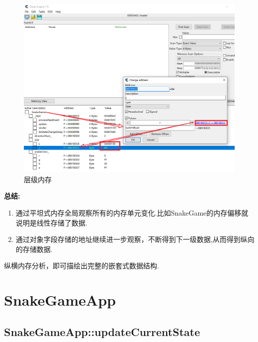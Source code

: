 \documentclass[AutoFakeBold,AutoFakeSlant]{beamer}
\begin{document}
	
	\begin{frame}[fragile]
		\begin{figure}
			\centering %
			\includegraphics[width=0.85\linewidth]{CE_MEM_TREE.png}
			\caption{层级内存}
			\label{fig:CE_MEM_TREE}
		\end{figure}
	\end{frame}
		
	\begin{frame}[fragile]
		\normalsize
		\textbf{总结:} \\ 
		\begin{enumerate}
			\item 通过平坦式内存全局观察所有的内存单元变化.比如SnakeGame的内存偏移就说明是线性存储了数据.
			\item 通过对象字段存储的地址继续进一步观察，不断得到下一级数据,从而得到纵向的存储数据.
		\end{enumerate}
		纵横内存分析，即可描绘出完整的嵌套式数据结构.
		\linespread{1} \selectfont
	\end{frame}
	
	\section{SnakeGameApp}
	\subsection{SnakeGameApp::updateCurrentState}
	
\end{document}
